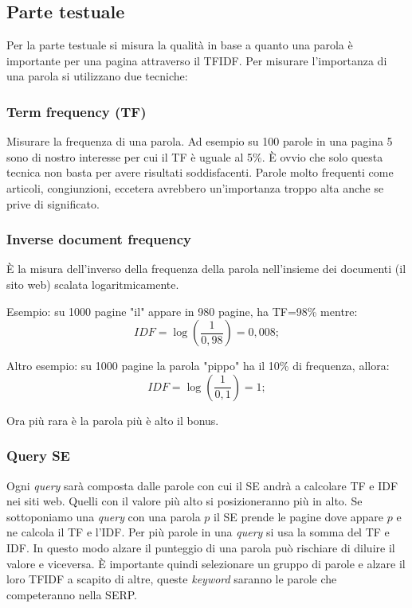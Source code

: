 		\subsection{Parte testuale}
			Per la parte testuale si misura la qualità in base a quanto una parola è importante per una pagina attraverso il TFIDF. Per misurare l'importanza di una parola si utilizzano due tecniche:
			
			\subsubsection{Term frequency (TF)}
				Misurare la frequenza di una parola. Ad esempio su 100 parole in una pagina 5 sono di nostro interesse per cui il TF è uguale al 5\%.
				È ovvio che solo questa tecnica non basta per avere risultati soddisfacenti. Parole molto frequenti come articoli, congiunzioni, eccetera avrebbero un'importanza troppo alta anche se prive di significato.
				
			\subsubsection{Inverse document frequency}
				È la misura dell'inverso della frequenza della parola nell'insieme dei documenti (il sito web) scalata logaritmicamente. 
				
				Esempio: su 1000 pagine "il" appare in 980 pagine, ha TF=98\% mentre:
				\[
					IDF=\log \left(\frac{1}{0,98} \right)=0,008;
				\]
				
				Altro esempio: su 1000 pagine la parola "pippo" ha il 10\% di frequenza, allora:
				\[
				IDF=\log \left(\frac{1}{0,1} \right)=1;
				\]
				
				Ora più rara è la parola più è alto il bonus.
				
			\subsubsection{Query SE}
				Ogni \emph{query} sarà composta dalle parole con cui il SE andrà a calcolare TF e IDF nei siti web. Quelli con il valore più alto si posizioneranno più in alto.
				Se sottoponiamo una \emph{query} con una parola $p$  il SE prende le pagine dove appare $p$ e ne calcola il TF e l'IDF. Per più parole in una \emph{query} si usa la somma del TF e IDF.
				In questo modo alzare il punteggio di una parola può rischiare di diluire il valore e viceversa. È importante quindi selezionare un gruppo di parole e alzare il loro TFIDF a scapito di altre, queste \emph{keyword} saranno le parole che competeranno nella SERP.
			

